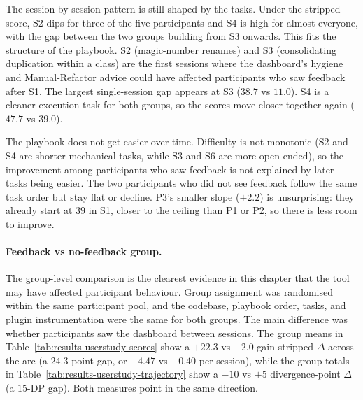 The session-by-session pattern is still shaped by the tasks. Under the stripped score, S2 dips for three of the five participants and S4 is high for almost everyone, with the gap between the two groups building from S3 onwards. This fits the structure of the playbook. S2 (magic-number renames) and S3 (consolidating duplication within a class) are the first sessions where the dashboard's hygiene and Manual-Refactor advice could have affected participants who saw feedback after S1. The largest single-session gap appears at S3 ($38.7$ vs $11.0$). S4 is a cleaner execution task for both groups, so the scores move closer together again ($47.7$ vs $39.0$).

The playbook does not get easier over time. Difficulty is not monotonic (S2 and S4 are shorter mechanical tasks, while S3 and S6 are more open-ended), so the improvement among participants who saw feedback is not explained by later tasks being easier. The two participants who did not see feedback follow the same task order but stay flat or decline. P3's smaller slope ($+2.2$) is unsurprising: they already start at $39$ in S1, closer to the ceiling than P1 or P2, so there is less room to improve.

\paragraph{Feedback vs no-feedback group.}
The group-level comparison is the clearest evidence in this chapter that the tool may have affected participant behaviour. Group assignment was randomised within the same participant pool, and the codebase, playbook order, tasks, and plugin instrumentation were the same for both groups. The main difference was whether participants saw the dashboard between sessions. The group means in Table~\ref{tab:results-userstudy-scores} show a $+22.3$ vs $-2.0$ gain-stripped $\Delta$ across the arc (a $24.3$-point gap, or $+4.47$ vs $-0.40$ per session), while the group totals in Table~\ref{tab:results-userstudy-trajectory} show a $-10$ vs $+5$ divergence-point $\Delta$ (a $15$-DP gap). Both measures point in the same direction.

